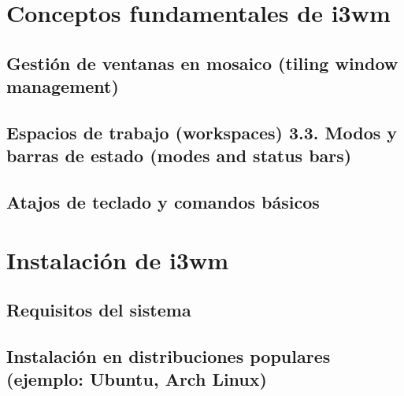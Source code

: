 \documentclass[
  a4paper,
]{article}
\begin{document}
\hypertarget{conceptos-fundamentales-de-i3wm}{%
\section{Conceptos fundamentales de
i3wm}\label{conceptos-fundamentales-de-i3wm}}

\hypertarget{gestiuxf3n-de-ventanas-en-mosaico-tiling-window-management}{%
\subsection{Gestión de ventanas en mosaico (tiling window
management)}\label{gestiuxf3n-de-ventanas-en-mosaico-tiling-window-management}}

\hypertarget{espacios-de-trabajo-workspaces-3.3.-modos-y-barras-de-estado-modes-and-status-bars}{%
\subsection{Espacios de trabajo (workspaces) 3.3. Modos y barras de
estado (modes and status
bars)}\label{espacios-de-trabajo-workspaces-3.3.-modos-y-barras-de-estado-modes-and-status-bars}}

\hypertarget{atajos-de-teclado-y-comandos-buxe1sicos}{%
\subsection{Atajos de teclado y comandos
básicos}\label{atajos-de-teclado-y-comandos-buxe1sicos}}

\hypertarget{instalaciuxf3n-de-i3wm}{%
\section{Instalación de i3wm}\label{instalaciuxf3n-de-i3wm}}

\hypertarget{requisitos-del-sistema}{%
\subsection{Requisitos del sistema}\label{requisitos-del-sistema}}

\hypertarget{instalaciuxf3n-en-distribuciones-populares-ejemplo-ubuntu-arch-linux}{%
\subsection{Instalación en distribuciones populares (ejemplo: Ubuntu,
Arch
Linux)}\label{instalaciuxf3n-en-distribuciones-populares-ejemplo-ubuntu-arch-linux}}
\end{document}
